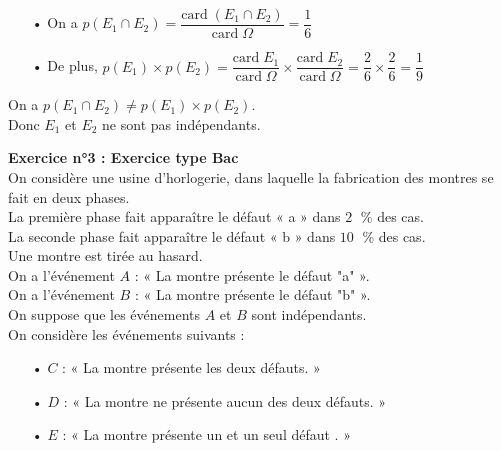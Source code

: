 \begin{itemize}
\item[•] On a $p\left(E_1 \cap E_2\right) = \dfrac{\mathrm{card \;}\left(E_1 \cap E_2\right)}{\mathrm{card \;} \Omega} = \dfrac{1}{6}$ \vspace*{.3cm} \\
\item[•] De plus, $p\left(E_1\right) \times p\left(E_2\right) = \dfrac{\mathrm{card \;} E_1}{\mathrm{card \;} \Omega} \times \dfrac{\mathrm{card \;} E_2}{\mathrm{card \;} \Omega} = \dfrac{2}{6} \times \dfrac{2}{6} = \dfrac{1}{9}$ \\
\end{itemize}

\vspace*{.3cm}

On a $p\left(E_1 \cap E_2\right) \neq p\left(E_1\right) \times p\left(E_2\right)$. \\

Donc $E_1$ et $E_2$ ne sont pas indépendants.

\newpage

\vspace*{-1cm}

\textbf{Exercice n°3 : Exercice type Bac} \\

On considère une usine d'horlogerie, dans laquelle la fabrication des montres se fait en deux phases. \\
La première phase fait apparaître le défaut « a » dans $2 \;$ \% des cas. \\
La seconde phase fait apparaître le défaut « b » dans $10 \;$ \% des cas. \\

Une montre est tirée au hasard. \\

On a l'événement $A$ : « La montre présente le défaut "a" ». \\
On a l'événement $B$ : « La montre présente le défaut "b" ». \\

On suppose que les événements $A$ et $B$ sont indépendants. \\

On considère les événements suivants :

\begin{itemize}
\item[•] $C$ : « La montre présente les deux défauts. »
\item[•] $D$ : « La montre ne présente aucun des deux défauts. »
\item[•] $E$ : « La montre présente un et un seul défaut . »
\end{itemize}

